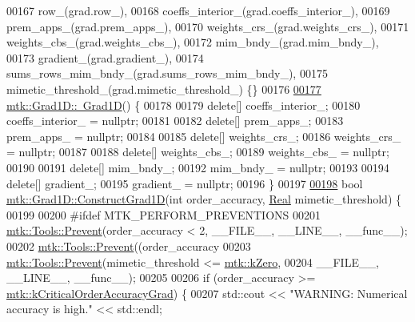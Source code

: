 \begin{DoxyCode}
00167   row\_(grad.row\_),
00168   coeffs\_interior\_(grad.coeffs\_interior\_),
00169   prem\_apps\_(grad.prem\_apps\_),
00170   weights\_crs\_(grad.weights\_crs\_),
00171   weights\_cbs\_(grad.weights\_cbs\_),
00172   mim\_bndy\_(grad.mim\_bndy\_),
00173   gradient\_(grad.gradient\_),
00174   sums\_rows\_mim\_bndy\_(grad.sums\_rows\_mim\_bndy\_),
00175   mimetic\_threshold\_(grad.mimetic\_threshold\_) \{\}
00176 
\hypertarget{mtk__grad__1d_8cc_source_l00177}{}\hyperlink{classmtk_1_1Grad1D_a2f9b1d306c0f09f36145bb1e7e486b54}{00177} \hyperlink{classmtk_1_1Grad1D_a2f9b1d306c0f09f36145bb1e7e486b54}{mtk::Grad1D::~Grad1D}() \{
00178 
00179   \textcolor{keyword}{delete}[] coeffs\_interior\_;
00180   coeffs\_interior\_ = \textcolor{keyword}{nullptr};
00181 
00182   \textcolor{keyword}{delete}[] prem\_apps\_;
00183   prem\_apps\_ = \textcolor{keyword}{nullptr};
00184 
00185   \textcolor{keyword}{delete}[] weights\_crs\_;
00186   weights\_crs\_ = \textcolor{keyword}{nullptr};
00187 
00188   \textcolor{keyword}{delete}[] weights\_cbs\_;
00189   weights\_cbs\_ = \textcolor{keyword}{nullptr};
00190 
00191   \textcolor{keyword}{delete}[] mim\_bndy\_;
00192   mim\_bndy\_ = \textcolor{keyword}{nullptr};
00193 
00194   \textcolor{keyword}{delete}[] gradient\_;
00195   gradient\_ = \textcolor{keyword}{nullptr};
00196 \}
00197 
\hypertarget{mtk__grad__1d_8cc_source_l00198}{}\hyperlink{classmtk_1_1Grad1D_a74ef5245cfae6fd158bd7f563a0c2e52}{00198} \textcolor{keywordtype}{bool} \hyperlink{classmtk_1_1Grad1D_a74ef5245cfae6fd158bd7f563a0c2e52}{mtk::Grad1D::ConstructGrad1D}(\textcolor{keywordtype}{int} order\_accuracy, 
      \hyperlink{group__c01-roots_gac080bbbf5cbb5502c9f00405f894857d}{Real} mimetic\_threshold) \{
00199 
00200 \textcolor{preprocessor}{  #ifdef MTK\_PERFORM\_PREVENTIONS}
00201   \hyperlink{classmtk_1_1Tools_a332324c6f25e66be9dff48c5987a3b9f}{mtk::Tools::Prevent}(order\_accuracy < 2, \_\_FILE\_\_, \_\_LINE\_\_, \_\_func\_\_);
00202   \hyperlink{classmtk_1_1Tools_a332324c6f25e66be9dff48c5987a3b9f}{mtk::Tools::Prevent}((order\_accuracy%
00203   \hyperlink{classmtk_1_1Tools_a332324c6f25e66be9dff48c5987a3b9f}{mtk::Tools::Prevent}(mimetic\_threshold <= \hyperlink{group__c01-roots_ga59a451a5fae30d59649bcda274fea271}{mtk::kZero},
00204                       \_\_FILE\_\_, \_\_LINE\_\_, \_\_func\_\_);
00205 
00206   \textcolor{keywordflow}{if} (order\_accuracy >= \hyperlink{group__c01-roots_ga295dd2f403c775ecd942c22b5a777496}{mtk::kCriticalOrderAccuracyGrad}) \{
00207     std::cout << \textcolor{stringliteral}{"WARNING: Numerical accuracy is high."} << std::endl;

\end{DoxyCode}
